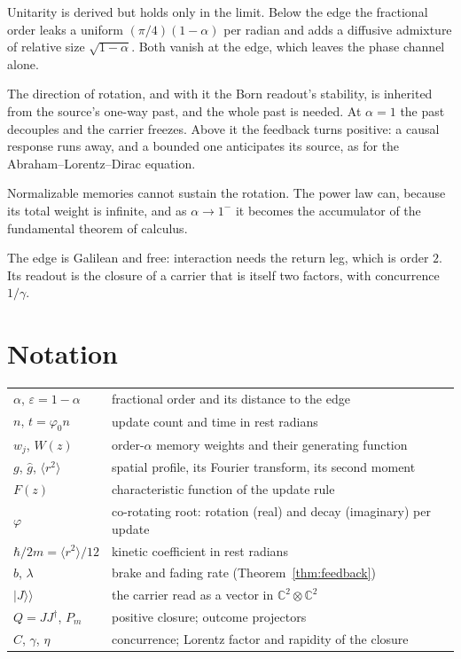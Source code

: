 \documentclass[11pt]{amsart}
\theoremstyle{definition}
\theoremstyle{remark}
\newcommand{\eps}{\varepsilon}
\begin{document}
Unitarity is derived but holds only in the limit. Below the edge the fractional order leaks a uniform $(\pi/4)(1-\alpha)$ per radian and adds a diffusive admixture of relative size $\sqrt{1-\alpha}$. Both vanish at the edge, which leaves the phase channel alone.

The direction of rotation, and with it the Born readout's stability, is inherited from the source's one-way past, and the whole past is needed. At $\alpha=1$ the past decouples and the carrier freezes. Above it the feedback turns positive: a causal response runs away, and a bounded one anticipates its source, as for the Abraham--Lorentz--Dirac equation.

Normalizable memories cannot sustain the rotation. The power law can, because its total weight is infinite, and as $\alpha\to1^-$ it becomes the accumulator of the fundamental theorem of calculus.

The edge is Galilean and free: interaction needs the return leg, which is order $2$. Its readout is the closure of a carrier that is itself two factors, with concurrence $1/\gamma$.

\appendix
\section{Notation}

{\small\begin{tabular}{ll}
$\alpha$, $\eps=1-\alpha$ & fractional order and its distance to the edge\\
$n$, $t=\varphi_0 n$ & update count and time in rest radians\\
$w_j$, $W(z)$ & order-$\alpha$ memory weights and their generating function\\
$g$, $\hat g$, $\langle r^2\rangle$ & spatial profile, its Fourier transform, its second moment\\
$F(z)$ & characteristic function of the update rule\\
$\varphi$ & co-rotating root: rotation (real) and decay (imaginary) per update\\
$\hbar/2m=\langle r^2\rangle/12$ & kinetic coefficient in rest radians\\
$b$, $\lambda$ & brake and fading rate (Theorem~\ref{thm:feedback})\\
$\lvert J\rangle\!\rangle$ & the carrier read as a vector in $\mathbb C^2\otimes\mathbb C^2$\\
$Q=JJ^\dagger$, $P_m$ & positive closure; outcome projectors\\
$C$, $\gamma$, $\eta$ & concurrence; Lorentz factor and rapidity of the closure\\
\end{tabular}}
\end{document}
